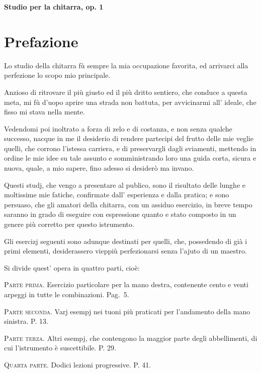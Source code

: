\documentclass[a4paper]{article}
\newcommand*{\titleContent}{Studio per la chitarra, op. 1}
\begin{document}
\thispagestyle{empty}
\begin{center}
  \Huge\bfseries\titleContent
\end{center}
\clearpage

\mbox{}
\thispagestyle{empty}
\clearpage

\section*{Prefazione}

Lo studio della chitarra fù sempre la mia occupazione favorita, ed arrivarci alla perfezione lo scopo mio principale.

Anzioso di ritrovare il più giusto ed il più dritto sentiero, che conduce a questa meta, mi fù d'uopo aprire una strada non battuta, per avvicinarmi all' ideale, che fisso mi stava nella mente.

Vedendomi poi inoltrato a forza di zelo e di costanza, e non senza qualche successo, nacque in me il desiderio di rendere partecipi del frutto delle mie veglie quelli, che corrono l'istessa carriera, e di preservargli dagli sviamenti, mettendo in ordine le mie idee su tale assunto e somministrando loro una guida corta, sicura e nuova, quale, a mio sapere, fino adesso si desiderò ma invano.

Questi studj, che vengo a presentare al publico, sono il risultato delle lunghe e moltissime mie fatiche, confirmate %
dall' esperienza e dalla pratica; e sono persuaso, che gli amatori della chitarra, con un assiduo esercizio, in breve tempo saranno in grado di eseguire con espressione quanto e %
stato composto in un genere più corretto per questo istrumento.

Gli esercizj seguenti sono adunque destinati per quelli, che, possedendo di già i primi elementi, desiderassero vieppiù perfezionarsi senza l'ajuto di un maestro.

Si divide quest' opera in quattro parti, cioè:

\textsc{Parte prima}.  Esercizio particolare per la mano destra, contenente cento e venti arpeggi in tutte le combinazioni.  Pag.\ 5.

\textsc{Parte seconda}.  Varj esempj nei tuoni %
più praticati per l'andamento della mano sinistra.  P. 13.

\textsc{Parte terza}.  Altri esempj, che contengono la maggior parte degli abbellimenti, di cui l'istrumento è suscettibile.  P. 29.

\textsc{Quarta parte}.  Dodici lezioni progressive.  P. 41.
\end{document}
